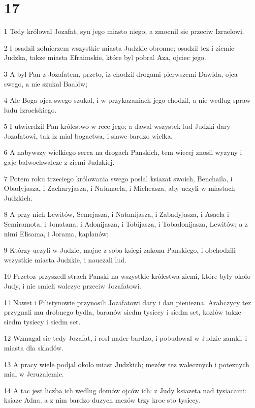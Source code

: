 \chapter{17}

\par 1 Tedy królowal Jozafat, syn jego miasto niego, a zmocnil sie przeciw Izraelowi.
\par 2 I osadzil zolnierzem wszystkie miasta Judzkie obronne; osadzil tez i ziemie Judzka, takze miasta Efraimskie, które byl pobral Aza, ojciec jego.
\par 3 A byl Pan z Jozafatem, przeto, iz chodzil drogami pierwszemi Dawida, ojca swego, a nie szukal Baalów;
\par 4 Ale Boga ojca swego szukal, i w przykazaniach jego chodzil, a nie wedlug spraw ludu Izraelskiego.
\par 5 I utwierdzil Pan królestwo w rece jego; a dawal wszystek lud Judzki dary Jozafatowi, tak iz mial bogactwa, i slawe bardzo wielka.
\par 6 A nabywszy wielkiego serca na drogach Panskich, tem wiecej znosil wyzyny i gaje balwochwalcze z ziemi Judzkiej.
\par 7 Potem roku trzeciego królowania swego poslal ksiazat swoich, Benchaila, i Obadyjasza, i Zacharyjasza, i Natanaela, i Micheasza, aby uczyli w miastach Judzkich.
\par 8 A przy nich Lewitów, Semejasza, i Natanijasza, i Zabadyjasza, i Asaela i Semiramota, i Jonatana, i Adonijasza, i Tobijasza, i Tobadonijasza, Lewitów; a z nimi Elisama, i Jorama, kaplanów;
\par 9 Którzy uczyli w Judzie, majac z soba ksiegi zakonu Panskiego, i obchodzili wszystkie miasta Judzkie, i nauczali lud.
\par 10 Przetoz przyszedl strach Panski na wszystkie królestwa ziemi, które byly okolo Judy, i nie smieli walczyc przeciw Jozafatowi.
\par 11 Nawet i Filistynowie przynosili Jozafatowi dary i dan pieniezna. Arabczycy tez przygnali mu drobnego bydla, baranów siedm tysiecy i siedm set, kozlów takze siedm tysiecy i siedm set.
\par 12 Wzmagal sie tedy Jozafat, i rosl nader bardzo, i pobudowal w Judzie zamki, i miasta dla skladów.
\par 13 A pracy wiele podjal okolo miast Judzkich; mezów tez walecznych i poteznych mial w Jeruzalemie.
\par 14 A tac jest liczba ich wedlug domów ojców ich: z Judy ksiazeta nad tysiacami: ksiaze Adna, a z nim bardzo duzych mezów trzy kroc sto tysiecy.

